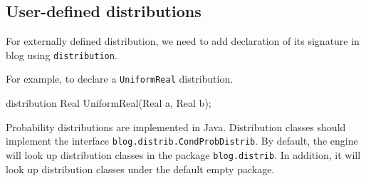 \subsection{User-defined distributions}\label{user-defined-distribution-section}

For externally defined distribution, we need to add declaration of its signature in blog using \verb|distribution|.

For example, to declare a \verb|UniformReal| distribution. 
\begin{blogcode}
distribution Real UniformReal(Real a, Real b);
\end{blogcode}

Probability distributions are implemented in Java.  Distribution classes should implement the interface \verb|blog.distrib.CondProbDistrib|. 
By default, the \bl engine will look up distribution classes in the package \verb|blog.distrib|. In addition, it will look up distribution classes under the default empty package. 

